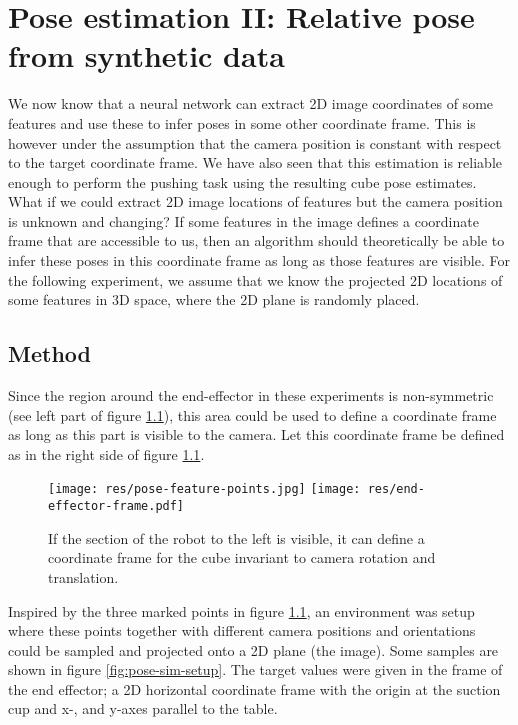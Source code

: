 \chapter{Pose estimation II: Relative pose from synthetic data}

We now know that a neural network can extract 2D image coordinates of some
features and use these to infer poses in some other coordinate frame.  This is
however under the assumption that the camera position is constant with respect
to the target coordinate frame. We have also seen that this estimation is
reliable enough to perform the pushing task using the resulting cube pose
estimates. What if we could extract 2D image locations of features but the
camera position is unknown and changing? If some features in the image defines
a coordinate frame that are accessible to us, then an algorithm should
theoretically be able to infer these poses in this coordinate frame as long as
those features are visible. For the following experiment, we assume that we
know the projected 2D locations of some features in 3D space, where the 2D plane
is randomly placed.

\section{Method}
\label{subsec:sim_moving}

Since the region around the end-effector in these experiments is non-symmetric
(see left part of figure \ref{fig:end-effector-frame}), this area could be used
to define a coordinate frame as long as this part is visible to the camera. Let
this coordinate frame be defined as in the right side of figure
\ref{fig:end-effector-frame}.

\begin{figure}[h!]
    \centering
    \texttt{[image: res/pose-feature-points.jpg]}
    \texttt{[image: res/end-effector-frame.pdf]}

    \caption{If the section of the robot to the left is visible, it can define
    a coordinate frame for the cube invariant to camera rotation and
    translation.}

    \label{fig:end-effector-frame}
    
\end{figure}

Inspired by the three marked points in figure \ref{fig:end-effector-frame}, an
environment was setup where these points together with different camera
positions and orientations could be sampled and projected onto a 2D plane (the
image). Some samples are shown in figure \ref{fig:pose-sim-setup}. The target
values were given in the frame of the end effector; a 2D horizontal coordinate
frame with the origin at the suction cup and x-, and y-axes parallel to the
table.

